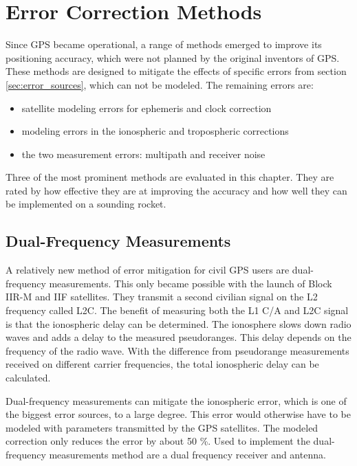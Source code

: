 \chapter{Error Correction Methods}\label{ch:error_correction}

Since GPS became operational, a range of methods emerged to improve its positioning accuracy, which were not planned by the original inventors of GPS.
These methods are designed to mitigate the effects of specific errors from section \ref{sec:error_sources}, which can not be modeled.
The remaining errors are:
\begin{itemize}
 \setlength\itemsep{1pt}
 \item satellite modeling errors for ephemeris and clock correction
 \item modeling errors in the ionospheric and tropospheric corrections
 \item the two measurement errors: multipath and receiver noise
\end{itemize}
Three of the most prominent methods are evaluated in this chapter.
They are rated by how effective they are at improving the accuracy and how well they can be implemented on a sounding rocket.


\section{Dual-Frequency Measurements}

A relatively new method of error mitigation for civil GPS users are dual-frequency measurements.
This only became possible with the launch of Block IIR-M and IIF satellites.
They transmit a second civilian signal on the L2 frequency called L2C.
The benefit of measuring both the L1 C/A and L2C signal is that the ionospheric delay can be determined.
The ionosphere slows down radio waves and adds a delay to the measured pseudoranges.
This delay depends on the frequency of the radio wave.
With the difference from pseudorange measurements received on different carrier frequencies, the total ionospheric delay can be calculated.

Dual-frequency measurements can mitigate the ionospheric error, which is one of the biggest error sources, to a large degree.
This error would otherwise have to be modeled with parameters transmitted by the GPS satellites.
The modeled correction only reduces the error by about 50 \%.
Used to implement the dual-frequency measurements method are a dual frequency receiver and antenna.
\cite{L1_L2}


